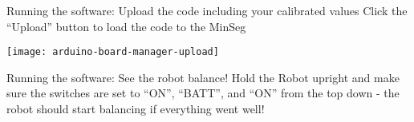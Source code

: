 \begin{frame}{Running the software: Upload the code including your calibrated values}
	Click the ``Upload'' button to load the code to the MinSeg
	\begin{center}
		\texttt{[image: arduino-board-manager-upload]}
	\end{center}
\end{frame}



\begin{frame}{Running the software: See the robot balance!}
	Hold the Robot upright and make sure the switches are set to ``ON'', ``BATT'', and ``ON'' from the top down - the robot should start balancing if everything went well!
\end{frame}




\begin{frame}{}{}
	
\end{frame}




